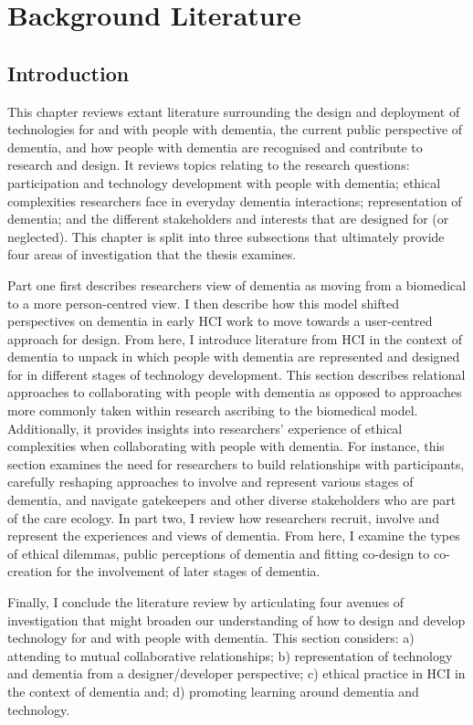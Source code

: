\chapter{Background Literature}
\label{BackgroundLit}

\section{Introduction}
\label{BL:Intro}
This chapter reviews extant literature surrounding the design and deployment of technologies for and with people with dementia, the current public perspective of dementia, and how people with dementia are recognised and contribute to research and design. It reviews topics relating to the research questions: participation and technology development with people with dementia; ethical complexities researchers face in everyday dementia interactions; representation of dementia; and the different stakeholders and interests that are designed for (or neglected). This chapter is split into three subsections that ultimately provide four areas of investigation that the thesis examines.

Part one first describes researchers view of dementia as moving from a biomedical to a more person-centred view. I then describe how this model shifted perspectives on dementia in early HCI work to move towards a user-centred approach for design. From here, I introduce literature from HCI in the context of dementia to unpack in which people with dementia are represented and designed for in different stages of technology development. This section describes relational approaches to collaborating with people with dementia as opposed to approaches more commonly taken within research ascribing to the biomedical model. Additionally, it provides insights into researchers' experience of ethical complexities when collaborating with people with dementia. For instance, this section examines the need for researchers to build relationships with participants, carefully reshaping approaches to involve and represent various stages of dementia, and navigate gatekeepers and other diverse stakeholders who are part of the care ecology. In part two, I review how researchers recruit, involve and represent the experiences and views of dementia. From here, I examine the types of ethical dilemmas, public perceptions of dementia and fitting co-design to co-creation for the involvement of later stages of dementia.

Finally, I conclude the literature review by articulating four avenues of investigation that might broaden our understanding of how to design and develop technology for and with people with dementia. This section considers: a) attending to mutual collaborative relationships; b) representation of technology and dementia from a designer/developer perspective; c) ethical practice in HCI in the context of dementia and; d) promoting learning around dementia and technology.

